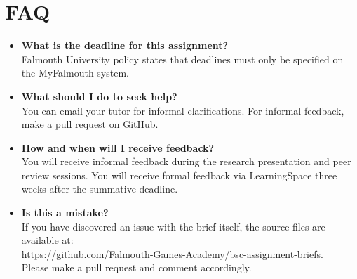 \documentclass{../../fal_assignment}
\begin{document}
\section*{FAQ}

\begin{itemize}
	\item 	\textbf{What is the deadline for this assignment?} \\ 
    		Falmouth University policy states that deadlines must only be specified on the MyFalmouth system.
    		
            \item 	\textbf{What should I do to seek help?} \\ 
    		You can email your tutor for informal clarifications. For informal feedback, make a pull request on GitHub. 
    		
            \item 	\textbf{How and when will I receive feedback?} \\ 
            You will receive informal feedback during the research presentation and peer review sessions.
            You will receive formal feedback via LearningSpace three weeks after the summative deadline.
    		
    	\item 	\textbf{Is this a mistake?} \\ 	
    		If you have discovered an issue with the brief itself, the source files are available at: \\
    		\url{https://github.com/Falmouth-Games-Academy/bsc-assignment-briefs}.\\
    		 Please make a pull request and comment accordingly.
\end{itemize}


%
\end{document}
